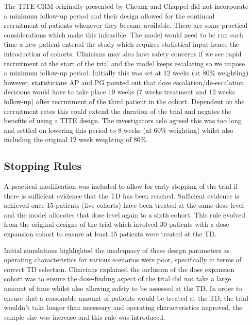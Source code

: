 The TITE-CRM originally presented by Cheung and Chappel \cite{cheungSequentialDesignsPhase2000} did not incorporate a minimum follow-up period and their design allowed for the continual recruitment of patients whenever they became available. There are some practical considerations which make this infeasible. The model would need to be run each time a new patient entered the study which requires statistical input hence the introduction of cohorts. Clinicians may also have safety concerns if we see rapid recruitment at the start of the trial and the model keeps escalating so we impose a minimum follow-up period. Initially this was set at 12 weeks (at 80\% weighting) however, statisticians AP and PG  pointed out that dose escalation/de-escalation decisions would have to take place 19 weeks (7 weeks treatment and 12 weeks follow-up) after recruitment of the third patient in the cohort. Dependent on the recruitment rates this could extend the duration of the trial and negates the benefits of using a TITE design. The investigators aslo agreed this was too long and settled on lowering this period to 8 weeks (at 60\% weighting) whilst also including the original 12 week weighting of 80\%.

%

\subsection{Stopping Rules}
\label{section2.3.3}%

A practical modification was included to allow for early stopping of the trial if there is sufficient evidence that the TD has been reached. Sufficient evidence is achieved once 15 patients (five cohorts) have been treated at the same dose level and the model allocates that dose level again to a sixth cohort. This rule evolved from the original designs of the trial which involved 30 patients with a dose expansion cohort to ensure at least 15 patients were treated at the TD. 

Initial simulations highlighted the inadequacy of these design parameters as operating characteristics for various scenarios were poor, specifically in terms of correct TD selection. Clinicians explained the inclusion of the dose expansion cohort was to ensure the dose-finding aspect of the trial did not take a large amount of time whilst also allowing safety to be assessed at the TD. In order to ensure that a reasonable amount of patients would be treated at the TD, the trial wouldn't take longer than necessary and operating characteristics improved, the sample size was increase and this rule was introduced.

